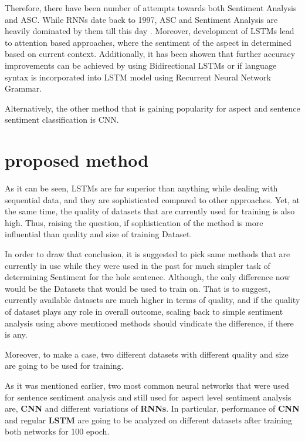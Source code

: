 \documentclass[conference]{IEEEtran}
\begin{document}
Therefore, there have been number of attempts towards both Sentiment Analysis and ASC. While RNNs\cite{Hochreiter:1997:LSM:1246443.1246450} date back to 1997, ASC and Sentiment Analysis are heavily dominated by them till this day \cite{bohnet-etal-2018-morphosyntactic}\cite{kuncoro-etal-2018-lstms}\cite{wang-etal-2018-target}. Moreover, development of LSTMs lead to attention based approaches, where the sentiment of the aspect in determined based on current context\cite{kuncoro-etal-2018-lstms}\cite{wang-etal-2018-target}. Additionally, it has been showen that further accuracy improvements can be achieved by using Bidirectional LSTMs\cite{Schuster:1997:BRN:2198065.2205129} or if language syntax is incorporated into LSTM model using Recurrent Neural Network Grammar\cite{dyer-etal-2016-recurrent}.

Alternatively, the other method that is gaining popularity for aspect and sentence sentiment classification is CNN\cite{kim-2014-convolutional}\cite{CNN}\cite{huang-carley-2018-parameterized}.


\section{proposed method}

As it can be seen, LSTMs are far superior than anything while dealing with sequential data, and they are sophisticated compared to other approaches. Yet, at the same time, the quality of datasets that are currently used for training is also high. Thus, raising the question, if sophistication of the method is more influential than quality and size of training Dataset.

In order to draw that conclusion, it is suggested to pick same methods that are currently in use while they were used in the past for much simpler task of determining Sentiment for the hole sentence. Although, the only difference now would be the Datasets that would be used to train on. That is to suggest, currently available datasets are much higher in terms of quality, and if the quality of dataset plays any role in overall outcome, scaling back to simple sentiment analysis using above mentioned methods should vindicate the difference, if there is any.

Moreover, to make a case, two different datasets with different quality and size are going to be used for training.

As it was mentioned earlier, two most common neural networks that were used for sentence sentiment analysis and still used for aspect level sentiment analysis are, \textbf{CNN} and different variations of \textbf{RNNs}. In particular, performance of \textbf{CNN} and regular \textbf{LSTM} are going to be analyzed on different datasets after training both networks for 100 epoch.
\end{document}
